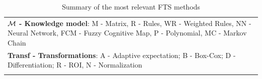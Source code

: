 \begin{center}
\begin{landscape}
\begin{longtable}[c]{|m{4cm}|c|c|c|c|c|c|c|c|c|m{5cm}|}
\multicolumn{11}{p{20cm}}{$\mathbf{\mathcal{M}}$\textbf{ - Knowledge model}: M - Matrix, R - Rules, WR - Weighted Rules, NN - Neural Network, FCM - Fuzzy Cognitive Map, P - Polynomial, MC - Markov Chain} \\
\multicolumn{11}{p{20cm}}{\textbf{Transf - Transformations}: A - Adaptive expectation; B - Box-Cox;  D - Differentiation; R - ROI, N - Normalization} \\ \hline
\caption{Summary of the most relevant FTS methods}
\label{tab:fts_methods}\\
\end{longtable}
\end{landscape}
\end{center}
